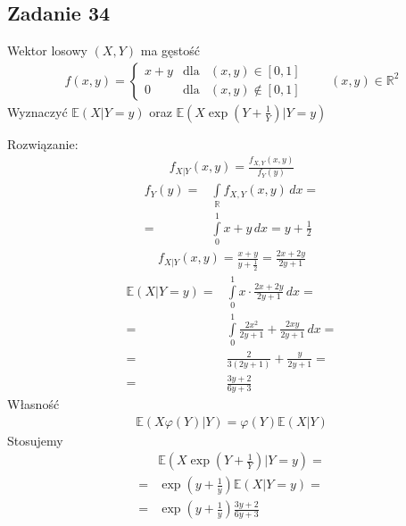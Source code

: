 \subsection*{Zadanie 34}
Wektor losowy $ (X,Y) $ ma gęstość
\begin{gather*}
f(x,y)=\left \{
\begin{array}{cll}
	x+y & \text{dla} & (x,y)\in[0,1]    \\
	 0  & \text{dla} & (x,y)\notin[0,1]
\end{array}
\right .
\qquad (x,y)\in \mathbb R ^2
\end{gather*}
Wyznaczyć $ \mathbb E \left(X|Y=y\right) $ oraz $ \mathbb E \left(X\exp \left(Y+\frac{1}{Y}\right)|Y=y\right) $

Rozwiązanie:
\begin{gather*}
f_{X|Y}(x,y)
=
\frac{f_{X,Y}(x,y)}{f_Y(y)}
\end{gather*}
\begin{align*}
f_Y(y)
=&
\int\limits_{\mathbb R }f_{X,Y}(x,y)\,dx
=\\=&
\int\limits_{0}^{1}x+y\,dx=y+\frac{1}{2}
\end{align*}
\begin{gather*}
f_{X|Y}(x,y)
=
\frac{x+y}{y+\frac{1}{2}}=\frac{2x+2y}{2y+1}
\end{gather*}
\begin{align*}
\mathbb E \left(X|Y=y\right)=&
\int\limits_{0}^{1}
x\cdot\frac{2x+2y}{2y+1}
\,dx
=\\=&
\int\limits_{0}^{1}
\frac{2 x^2}{2 y+1}+\frac{2 x y}{2 y+1}
\,dx
=\\=&
\frac{2}{3 (2 y+1)}+\frac{y}{2 y+1}
=\\=&
\frac{3 y+2}{6 y+3}
\end{align*}
Własność
\begin{gather*}
\mathbb E \left(X\varphi(Y)|Y\right)
=
\varphi(Y)\mathbb E \left(X|Y\right)
\end{gather*}
Stosujemy
\begin{align*}
&\mathbb E \left(X\exp \left(Y+\tfrac{1}{Y}\right)|Y=y\right)
=\\=&
\exp \left(y+\tfrac{1}{y}\right)\mathbb E \left(X|Y=y\right)
=\\=&
\exp \left(y+\tfrac{1}{y}\right)\frac{3 y+2}{6 y+3}
\end{align*}
%
%
